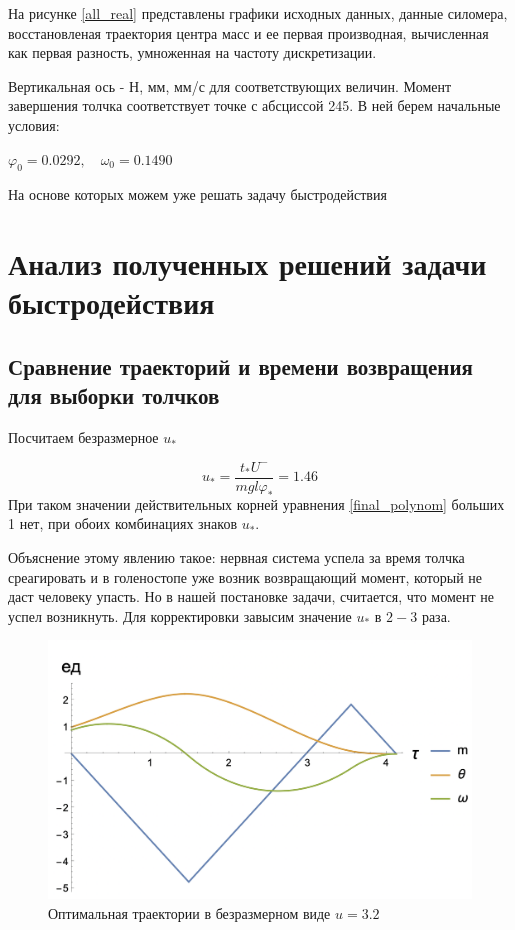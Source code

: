 \documentclass[a4paper,12pt, openany]{book}
\theoremstyle{plain} %
\theoremstyle{definition} %
\theoremstyle{remark} %
\numberwithin{equation}{chapter}
\begin{document}
{На рисунке \ref{all_real} представлены графики исходных данных, данные силомера, восстановленая траектория центра масс и ее первая производная, вычисленная как первая разность, умноженная на частоту дискретизации.

Вертикальная ось - Н, мм, мм/с для соответствующих величин. Момент завершения толчка соответствует точке с абсциссой 245. В ней берем начальные условия:

$\varphi_0=0.0292,\quad \omega_0=0.1490$

На основе которых можем уже решать задачу быстродействия

\newpage

\chapter{Анализ полученных решений задачи быстродействия}

\section{Сравнение траекторий и времени возвращения для выборки толчков}

Посчитаем безразмерное $u_\ast$

\[
    u_\ast=\frac{t_\ast U^-}{mgl\varphi_\ast }=1.46
\]
При таком значении действительных корней уравнения \eqref{final_polynom} больших 1 нет,
при обоих комбинациях знаков $u_\ast$.

Объяснение этому явлению такое: нервная система успела за время толчка среагировать и в голеностопе уже возник возвращающий момент, который не даст человеку упасть.
Но в нашей постановке задачи, считается, что момент не успел возникнуть. Для корректировки завысим значение $u_\ast$ в $2-3$ раза.

\begin{figure}[h!]
    \centering
    \includegraphics[width=0.7\linewidth]{3_graphs.png}
    \caption{Оптимальная траектории в безразмерном виде $u=3.2$ }
    \label{3_graphs}
\end{figure}

}
\end{document}

